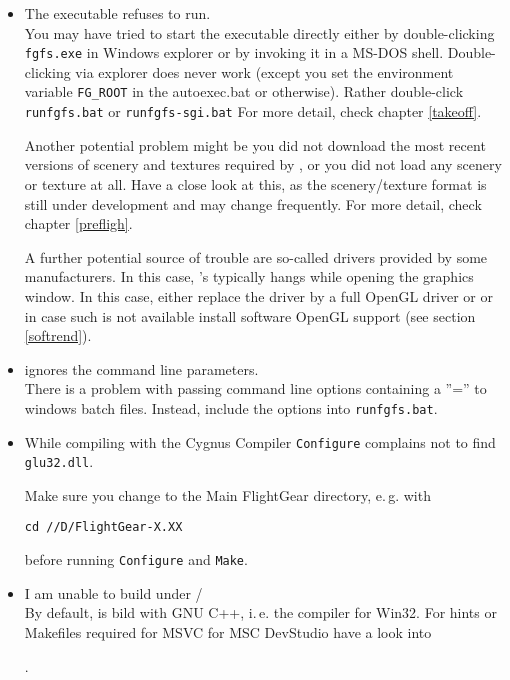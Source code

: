 \begin{itemize}
\item{The executable refuses to run.}\\
 You may have tried to start the executable directly either by
 double-clicking \texttt{fgfs.exe} in Windows explorer or by invoking it
 in a MS-DOS shell. Double-clicking via explorer does never work
 (except you set the environment variable \texttt{FG\_ROOT}
 in the autoexec.bat or otherwise). Rather double-click \texttt{runfgfs.bat} or
 \texttt{runfgfs-sgi.bat}  For more detail, check chapter \ref{takeoff}.

 Another potential problem might be you did not download the
 most recent versions of scenery and textures required by \FlightGear, or
 you did not load any scenery or texture at all. Have a close look
 at this, as the scenery/texture format is still under development and may
 change frequently. For more detail, check chapter \ref{prefligh}.

 A further potential source of trouble are so-called
  drivers provided by some manufacturers. In this case,
 {\FlightGear}'s typically hangs while opening the graphics window.
 In this case, either replace the  driver by a
 full OpenGL driver or or in case such is not available install
 software OpenGL support (see section \ref{softrend}).

\item{\FlightGear ignores the command line parameters.}\\
 There is a problem with passing command line options containing a
 ''='' to windows batch files. Instead, include the options into
 \texttt{runfgfs.bat}.

\item{While compiling with the Cygnus Compiler \texttt{Configure}
complains not to find \texttt{glu32.dll}}.

Make sure you change to the Main FlightGear directory, e.\,g. with

\texttt{cd //D/FlightGear-X.XX}

before running \texttt{Configure} and \texttt{Make}.

\item{I am unable to build \FlightGear under /}\\
 By default, \FlightGear is bild with GNU C++, i.\,e. the
  compiler for Win32. For hints or Makefiles
 required for MSVC for MSC DevStudio have a look into

 .

\end{itemize}


